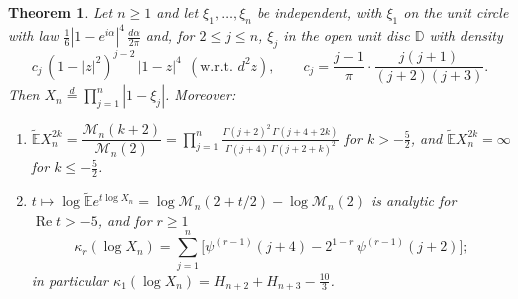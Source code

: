 \documentclass[12pt]{amsart}
\newtheorem{theorem}{Theorem}
\theoremstyle{remark}
\newcommand{\Et}{\widetilde{\mathbb{E}}}
\newcommand{\1}{\mathbf{1}}
\begin{document}
\begin{theorem}\label{thm:product}
Let $n\ge1$ and let $\xi_1,\dots,\xi_n$ be independent, with $\xi_1$ on the
unit circle with law $\frac16|1-e^{i\alpha}|^4\,\frac{d\alpha}{2\pi}$ and,
for $2\le j\le n$, $\xi_j$ in the open unit disc $\mathbb D$ with density
\[
c_j\,(1-|z|^2)^{j-2}\,|1-z|^4\ \ (\text{w.r.t. } d^2z),\qquad
c_j=\frac{j-1}{\pi}\cdot\frac{j(j+1)}{(j+2)(j+3)} .
\]
Then $X_n\overset{d}{=}\prod_{j=1}^n|1-\xi_j|$. Moreover:
\begin{enumerate}
\item[(a)] $\Et X_n^{2k}=\dfrac{\mathcal M_n(k+2)}{\mathcal M_n(2)}=
\displaystyle\prod_{j=1}^n\frac{\Gamma(j+2)^2\,\Gamma(j+4+2k)}
{\Gamma(j+4)\,\Gamma(j+2+k)^2}$ for $k>-\frac52$, and $\Et X_n^{2k}=\infty$
for $k\le-\frac52$.
\item[(b)] $t\mapsto\log\Et e^{t\log X_n}=\log\mathcal M_n(2+t/2)-\log\mathcal M_n(2)$
is analytic for $\operatorname{Re}t>-5$, and for $r\ge1$
\begin{equation}\label{eq:cumulants}
\kappa_r(\log X_n)=\sum_{j=1}^n\Big[\psi^{(r-1)}(j+4)-2^{1-r}\,
\psi^{(r-1)}(j+2)\Big];
\end{equation}
in particular $\kappa_1(\log X_n)=H_{n+2}+H_{n+3}-\frac{10}3$.
\end{enumerate}
\end{theorem}
\end{document}
